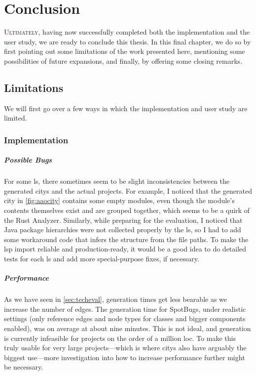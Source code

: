 \documentclass[../thesis]{subfiles}
\begin{document}
\chapter{Conclusion}\label{ch:conclusion}

\lettrine[lines=3]{\textcolor{Maroon}{U}}{ltimately}, having now successfully completed both the implementation and the user study, we are ready to conclude this thesis.
In this final chapter, we do so by first pointing out some limitations of the work presented here, mentioning some possibilities of future expansions, and finally, by offering some closing remarks.

\section{Limitations}
We will first go over a few ways in which the implementation and user study are limited.

\subsection{Implementation}
\paragraph{Possible Bugs}
For some \gls{ls}, there sometimes seem to be slight inconsistencies between the generated \glspl{city} and the actual projects.
For example, I noticed that the generated city in \cref{fig:aaocity} contains some empty modules, even though the module's contents themselves exist and are grouped together, which seems to be a quirk of the Rust Analyzer.
Similarly, while preparing \SEE{} for the evaluation, I noticed that Java package hierarchies were not collected properly by the \gls{ls}, so I had to add some workaround code that infers the structure from the file paths.
To make the \gls{lsp} import reliable and production-ready, it would be a good idea to do detailed tests for each \gls{ls} and add more special-purpose fixes, if necessary.

\paragraph{Performance}
As we have seen in \cref{sec:techeval}, generation times get less bearable as we increase the number of edges.
The generation time for SpotBugs, under realistic settings (only reference edges and node types for classes and bigger components enabled), was on average at about nine minutes.
This is not ideal, and generation is currently infeasible for projects on the order of a million \gls{loc}.
To make this truly usable for very large projects---which is where \glspl{city} also have arguably the biggest use---more investigation into how to increase performance further might be necessary.
\end{document}

